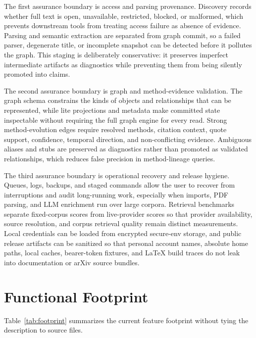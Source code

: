 \documentclass[11pt]{article}
\begin{document}
The first assurance boundary is access and parsing provenance. Discovery records whether full text is open, unavailable, restricted, blocked, or malformed, which prevents downstream tools from treating access failure as absence of evidence. Parsing and semantic extraction are separated from graph commit, so a failed parser, degenerate title, or incomplete snapshot can be detected before it pollutes the graph. This staging is deliberately conservative: it preserves imperfect intermediate artifacts as diagnostics while preventing them from being silently promoted into claims.

The second assurance boundary is graph and method-evidence validation. The graph schema constrains the kinds of objects and relationships that can be represented, while lite projections and metadata make committed state inspectable without requiring the full graph engine for every read. Strong method-evolution edges require resolved methods, citation context, quote support, confidence, temporal direction, and non-conflicting evidence. Ambiguous aliases and stubs are preserved as diagnostics rather than promoted as validated relationships, which reduces false precision in method-lineage queries.

The third assurance boundary is operational recovery and release hygiene. Queues, logs, backups, and staged commands allow the user to recover from interruptions and audit long-running work, especially when imports, PDF parsing, and LLM enrichment run over large corpora. Retrieval benchmarks separate fixed-corpus scores from live-provider scores so that provider availability, source resolution, and corpus retrieval quality remain distinct measurements. Local credentials can be loaded from encrypted secure-env storage, and public release artifacts can be sanitized so that personal account names, absolute home paths, local caches, bearer-token fixtures, and LaTeX build traces do not leak into documentation or arXiv source bundles.

\section{Functional Footprint}

Table~\ref{tab:footprint} summarizes the current feature footprint without tying the description to source files.
\end{document}
